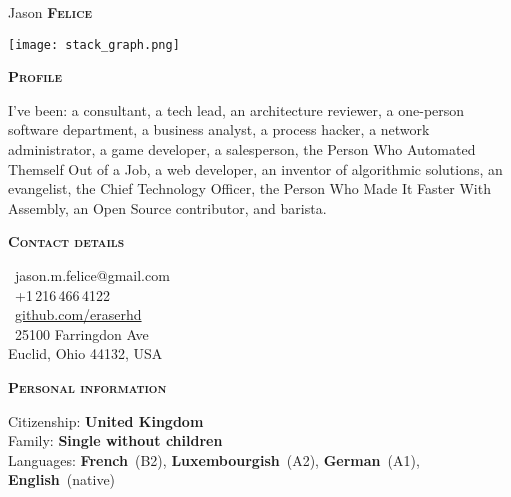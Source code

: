 \documentclass[11pt, a4paper]{article}
\newcommand{\headleft}[1]{\vspace*{3ex}\textsc{\textbf{#1}}\par%
    \vspace*{-1.5ex}\hrulefill\par\vspace*{0.7ex}}
\begin{document}
\setlength{\topskip}{0pt}
\setlength{\parindent}{0pt}
\setlength{\parskip}{0pt}
\setlength{\fboxsep}{0pt}
\pagestyle{empty}
\raggedbottom

\begin{minipage}[t]{0.33\textwidth} %
\colorbox{cvblue}{\begin{minipage}[t][5mm][t]{\textwidth}\null\hfill\null\end{minipage}}

\vspace{-.2ex} %
\colorbox{cvblue!90}{\color{white}  %
\textwidth\relax%
\begin{minipage}[t][293mm][t]{0.82\textwidth}
\raggedright
\vspace*{2.5ex}

\Large Jason \textbf{\textsc{Felice}} \normalsize 

\null\hfill\texttt{[image: stack\_graph.png]}\hfill\null

\vspace*{0.5ex} %

\headleft{Profile}

I've been: a consultant, a tech lead, an architecture reviewer, a one-person
software department, a business analyst, a process hacker, a network administrator,
a game developer, a salesperson, the Person Who Automated Themself Out of a Job, a web
developer, an inventor of algorithmic solutions, an evangelist, the Chief Technology Officer,
the Person Who Made It Faster With Assembly, an Open Source contributor, and barista.

\headleft{Contact details}
\small %
\MVAt\ {\small jason.m.felice@gmail.com} \\[0.4ex]
\Mobilefone\ +1\,216\,466\,4122 \\[0.5ex]
\Mundus\ \href{https://github.com/eraserhd}{github.com/eraserhd} \\[0.1ex]
\Letter\ 25100 Farringdon Ave \\[0.5ex]
Euclid, Ohio 44132, USA
\normalsize

\headleft{Personal information}
Citizenship: \textbf{United Kingdom} \\[0.5ex]
Family: \textbf{Single without children} \\[0.5ex]
Languages: \textbf{French}~(B2), \textbf{Luxembourgish}~(A2), \textbf{German}~(A1), \textbf{English}~(native)


\end{minipage}}
\end{minipage}
\end{document}
